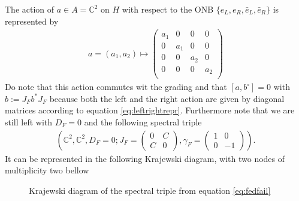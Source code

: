 The action of $a \in A = \mathbb{C}^2$ on $H$ with respect to the ONB
$\{e_L, e_R, \bar{e}_L, \bar{e}_R\}$ is represented by
\begin{align}\label{eq:leftrightrepr}
    a =
    (a_1 , a_2 ) \mapsto
        \begin{pmatrix}
            a_1 &0 &0 &0\\
             0&a_1 &0 &0\\
            0 &0 &a_2 &0\\
            0 &0 &0 &a_2\\
        \end{pmatrix}
\end{align}
Do note that this action commutes wit the grading and that $[a, b^\circ] = 0$
with $b:= J_F b^*J_F$ because both the left and the right action are given by
diagonal matrices according to equation \eqref{eq:leftrightrepr}. Furthermore
note that we are still left with $D_F = 0$ and the following spectral triple
\begin{align}\label{eq:fedfail}
        \left( \mathbb{C}^2, \mathbb{C}^2, D_F=0; J_F =
        \begin{pmatrix}
            0 & C \\ C &0
        \end{pmatrix},
        \gamma _F =
        \begin{pmatrix}
            1 & 0 \\ 0 &-1
        \end{pmatrix}
        \right).
    \end{align}
It can be represented in the following Krajewski diagram,
with two nodes of multiplicity two bellow
    \begin{figure}[H] \centering
        \caption{Krajewski diagram of the spectral triple from equation \ref{eq:fedfail}}
    \end{figure}
